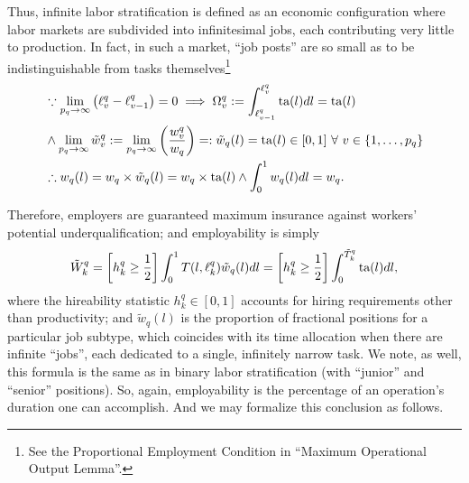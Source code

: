 \documentclass[hidelinks, nonatbib]{elsarticle}
\begin{document}
\begin{definition}
    Thus, infinite labor stratification is defined as an economic configuration where labor markets are subdivided into infinitesimal jobs, each contributing very little to production. In fact, in such a market, ``job posts'' are so small as to be indistinguishable from tasks themselves\footnote{See the Proportional Employment Condition in ``Maximum Operational Output Lemma''.}
\begin{align}
    &
    \because
    \lim_{p_q \rightarrow \infty}{
        \left(
            \ell_{v}^{q}
            -
            \ell_{v-1}^{q}
        \right)
    }
    =
    0
    \implies
    \Omega_{v}^{q}
    :=
    \int_{
        \ell_{v-1}^{q}
    }^{
        \ell_{v}^{q}
    }
    \text{ta}(l)dl
    =
    \text{ta}(l)
    \\
    &
    \land
    \lim_{p_q \rightarrow \infty}{
        \tilde{w}_{v}^{q}
    }
    := 
    \lim_{p_q \rightarrow \infty}{
        \left(
            \frac{
                w_{v}^{q}
            }{
                w_q
            }
        \right)
    }
    =:
    \tilde{w}_{q}(l)
    =
    \text{ta}(l)
    \in [0,1]
    \
    \forall
    \
    v \in \{1, \dots, p_q\}
    \\
    &
    \therefore
    w_{q}(l)
    = 
    w_q \times \tilde{w}_{q}(l)
    =
    w_q \times \text{ta}(l)
    \land
    \int_{0}^{1}{
        w_{q}(l)
        dl
    }
    =
    w_q
    .
    \end{align}
\end{definition} 
Therefore, employers are guaranteed maximum insurance against workers' potential underqualification; and employability is simply
\begin{gather}
\tilde{W}_{k}^{q} 
= 
\left[
    h_{k}^{q}
    \geq
    \frac{1}{2}
\right]
\int_{0}^{1}
T(l, \ell_{k}^{q})
\tilde{w}_{q}(l)
dl
= 
\left[
    h_{k}^{q}
    \geq
    \frac{1}{2}
\right]
\int_{0}^{\tilde{T}_{k}^{q}}
\text{ta}(l)
dl
,
\end{gather}
where the hireability statistic $h_{k}^{q} \in [0,1]$ accounts for hiring requirements other than productivity; and $\tilde{w}_{q}(l)$ is the proportion of fractional positions for a particular job subtype, which coincides with its time allocation when there are infinite ``jobs'', each dedicated to a single, infinitely narrow task. We note, as well, this formula is the same as in binary labor stratification (with ``junior'' and ``senior'' positions). So, again, employability is the percentage of an operation's duration one can accomplish. And we may formalize this conclusion as follows.
\end{document}
